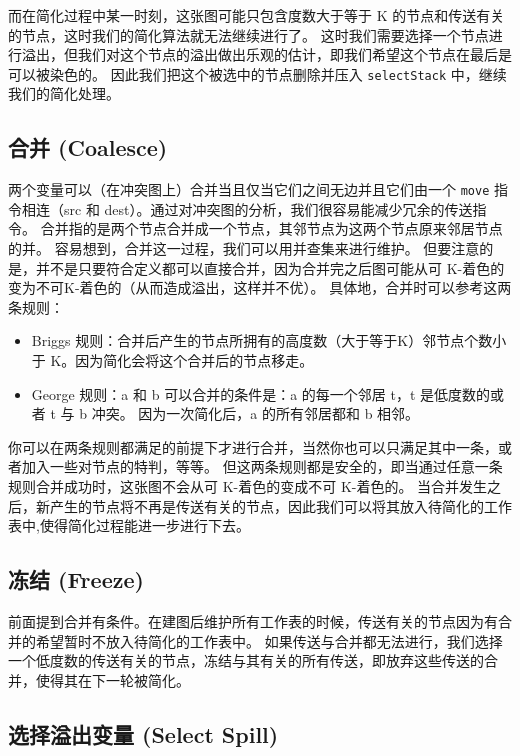而在简化过程中某一时刻，这张图可能只包含度数大于等于 K 的节点和传送有关的节点，这时我们的简化算法就无法继续进行了。
这时我们需要选择一个节点进行溢出，但我们对这个节点的溢出做出乐观的估计，即我们希望这个节点在最后是可以被染色的。
因此我们把这个被选中的节点删除并压入 \texttt{selectStack} 中，继续我们的简化处理。

\subsection{合并 (Coalesce)}

两个变量可以（在冲突图上）合并当且仅当它们之间无边并且它们由一个 \texttt{move} 指令相连（src 和 dest）。通过对冲突图的分析，我们很容易能减少冗余的传送指令。
合并指的是两个节点合并成一个节点，其邻节点为这两个节点原来邻居节点的并。
容易想到，合并这一过程，我们可以用并查集来进行维护。
但要注意的是，并不是只要符合定义都可以直接合并，因为合并完之后图可能从可 K-着色的变为不可K-着色的（从而造成溢出，这样并不优）。
具体地，合并时可以参考这两条规则：
\begin{itemize}
    \item Briggs 规则：合并后产生的节点所拥有的高度数（大于等于K）邻节点个数小于 K。因为简化会将这个合并后的节点移走。
    \item George 规则：a 和 b 可以合并的条件是：a 的每一个邻居 t，t 是低度数的或者 t 与 b 冲突。
    因为一次简化后，a 的所有邻居都和 b 相邻。
\end{itemize}

你可以在两条规则都满足的前提下才进行合并，当然你也可以只满足其中一条，或者加入一些对节点的特判，等等。
但这两条规则都是安全的，即当通过任意一条规则合并成功时，这张图不会从可 K-着色的变成不可 K-着色的。
当合并发生之后，新产生的节点将不再是传送有关的节点，因此我们可以将其放入待简化的工作表中,使得简化过程能进一步进行下去。

\subsection{冻结 (Freeze)}

前面提到合并有条件。在建图后维护所有工作表的时候，传送有关的节点因为有合并的希望暂时不放入待简化的工作表中。
如果传送与合并都无法进行，我们选择一个低度数的传送有关的节点，冻结与其有关的所有传送，即放弃这些传送的合并，使得其在下一轮被简化。

\subsection{选择溢出变量 (Select Spill)}

